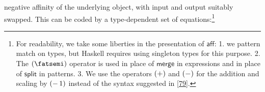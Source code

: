 \documentclass[nolinenum]{jfp}
\begin{document}
negative affinity of the underlying object, with input and output
suitably swapped. This can be coded by a type-dependent set of
equations:\footnote{For readability, we take some liberties in the presentation of \(\mathsf{aff}\):
1. we pattern match on types, but Haskell requires using singleton
types for this purpose. 2. The \(\allowbreak{}\mathnormal{(}\mskip 0.0mu\mathnormal{\fatsemi }\mskip 0.0mu\mathnormal{)}\allowbreak{}\) operator is used in place
of \(\mathsf{merge}\) in expressions and in place of \(\mathsf{split}\) in
patterns. 3. We use the operators \(\allowbreak{}\mathnormal{(}\mskip 0.0mu\mathnormal{+}\mskip 0.0mu\mathnormal{)}\allowbreak{}\) and \(\allowbreak{}\mathnormal{(}\mskip 0.0mu\mathnormal{-}\mskip 0.0mu\mathnormal{)}\allowbreak{}\) for the addition and
scaling by \(\allowbreak{}\mathnormal{(}\mskip 0.0mu\mathnormal{-}\mskip 3.0mu\mathrm{1}\mskip 0.0mu\mathnormal{)}\allowbreak{}\) instead of the syntax suggested in \cref{79}.} 
\end{document}
